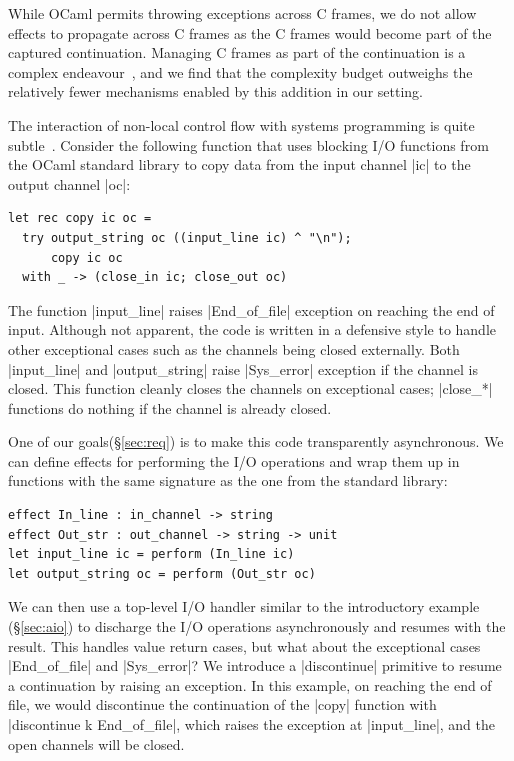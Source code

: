 \documentclass[sigplan,10pt,review,anonymous]{acmart}\settopmatter{printfolios=true,printccs=false,printacmref=false}
\begin{document}
While OCaml permits throwing exceptions across C frames, we do not allow
effects to propagate across C frames as the C frames would become part of the
captured continuation. Managing C frames as part of the continuation is a
complex endeavour~\cite{Daan17Aplas}, and we find that the complexity budget
outweighs the relatively fewer mechanisms enabled by this addition in our
setting.

The interaction of non-local control flow with systems programming is quite
subtle~\cite{TFP17}. Consider the following function that uses blocking I/O
functions from the OCaml standard library to copy data from the input channel
|ic| to the output channel |oc|:
\begin{lstlisting}
let rec copy ic oc =
  try output_string oc ((input_line ic) ^ "\n");
      copy ic oc
  with _ -> (close_in ic; close_out oc)
\end{lstlisting}

The function |input_line| raises |End_of_file| exception on reaching the end of input.
Although not apparent, the code is written in a defensive style to handle other
exceptional cases such as the channels being closed externally. Both
|input_line| and |output_string| raise |Sys_error| exception if the channel is
closed. This function cleanly closes the channels on exceptional cases;
|close_*| functions do nothing if the channel is already closed.

One of our goals(\S\ref{sec:req}) is to make this code transparently
asynchronous. We can define effects for performing the I/O operations  and wrap
them up in functions with the same signature as the one from the standard
library:
\begin{lstlisting}
effect In_line : in_channel -> string
effect Out_str : out_channel -> string -> unit
let input_line ic = perform (In_line ic)
let output_string oc = perform (Out_str oc)
\end{lstlisting}

We can then use a top-level I/O handler similar to the introductory example
(\S\ref{sec:aio}) to discharge the I/O operations asynchronously and resumes
with the result. This handles value return cases, but what about the
exceptional cases |End_of_file| and |Sys_error|? We introduce a |discontinue|
primitive to resume a continuation by raising an exception. In this example, on
reaching the end of file, we would discontinue the continuation of the |copy|
function with |discontinue k End_of_file|, which raises the exception at
|input_line|, and the open channels will be closed.
\end{document}
